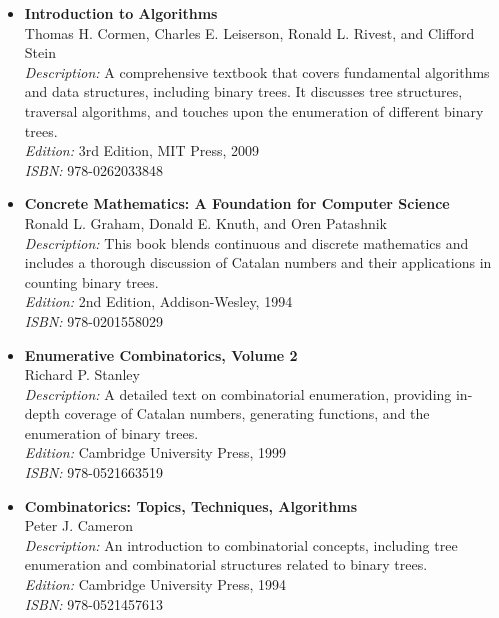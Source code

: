 \documentclass{article}
\begin{document}
\begin{itemize}
    \item \textbf{Introduction to Algorithms} \\
    Thomas H. Cormen, Charles E. Leiserson, Ronald L. Rivest, and Clifford Stein \\
    \textit{Description:} A comprehensive textbook that covers fundamental algorithms and data structures, including binary trees. It discusses tree structures, traversal algorithms, and touches upon the enumeration of different binary trees. \\
    \textit{Edition:} 3rd Edition, MIT Press, 2009 \\
    \textit{ISBN:} 978-0262033848

    \item \textbf{Concrete Mathematics: A Foundation for Computer Science} \\
    Ronald L. Graham, Donald E. Knuth, and Oren Patashnik \\
    \textit{Description:} This book blends continuous and discrete mathematics and includes a thorough discussion of Catalan numbers and their applications in counting binary trees. \\
    \textit{Edition:} 2nd Edition, Addison-Wesley, 1994 \\
    \textit{ISBN:} 978-0201558029

    \item \textbf{Enumerative Combinatorics, Volume 2} \\
    Richard P. Stanley \\
    \textit{Description:} A detailed text on combinatorial enumeration, providing in-depth coverage of Catalan numbers, generating functions, and the enumeration of binary trees. \\
    \textit{Edition:} Cambridge University Press, 1999 \\
    \textit{ISBN:} 978-0521663519

    \item \textbf{Combinatorics: Topics, Techniques, Algorithms} \\
    Peter J. Cameron \\
    \textit{Description:} An introduction to combinatorial concepts, including tree enumeration and combinatorial structures related to binary trees. \\
    \textit{Edition:} Cambridge University Press, 1994 \\
    \textit{ISBN:} 978-0521457613
\end{itemize}
\end{document}
